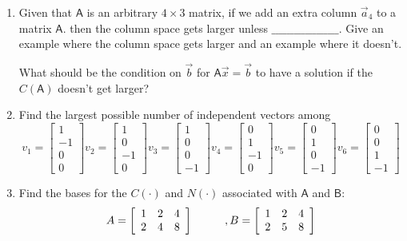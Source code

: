\documentclass[a4paper, 11pt]{article}
\newcommand{\mat}[1]{\boldsymbol { \mathsf{#1}} }
\begin{document}
\begin{enumerate}
\begin{enumerate}
\end{enumerate}

\item Given that $\mat A$ is an arbitrary $4 \times 3$ matrix, if we add an extra column $\vec a_4$ to a matrix $\mat A$. then the column space gets larger unless $\_ \_ \_\_ \_ \_\_ \_ \_\_ \_ \_\_ \_ \_\_ \_ \_$. Give an example where the column space gets larger and an example where it doesn't. 

What should be the condition on $\vec b$ for $\mat A \vec x = \vec b$ to have a solution if the $C(\mat A)$ doesn't get larger?  

\item Find the largest possible number of independent vectors among
\[ v_1 = \left[ \begin{array}{c} 1\\ -1\\ 0\\ 0 \end{array} \right]
 v_2 = \left[ \begin{array}{c} 1\\ 0\\ -1\\ 0 \end{array} \right]
 v_3 = \left[ \begin{array}{c} 1\\ 0\\ 0\\ -1 \end{array} \right]
 v_4 = \left[ \begin{array}{c} 0\\ 1\\ -1\\ 0 \end{array} \right]
 v_5 = \left[ \begin{array}{c} 0\\ 1\\  0\\ -1\end{array} \right]
 v_6 = \left[ \begin{array}{c} 0\\ 0\\ 1\\ -1 \end{array} \right]
\]

\item Find the bases for the $C(\mat \cdot)$ and $N(\mat \cdot)$ associated with $\mat A$ and $\mat B$:
\[ A = \left[ \begin{array}{ccc}
1&2&4\\
2&4&8
\end{array} \right]
\hspace{10mm}, B = \left[ \begin{array}{ccc}
1&2&4\\
2&5&8
\end{array} \right]\]


\end{enumerate}
\end{document}
